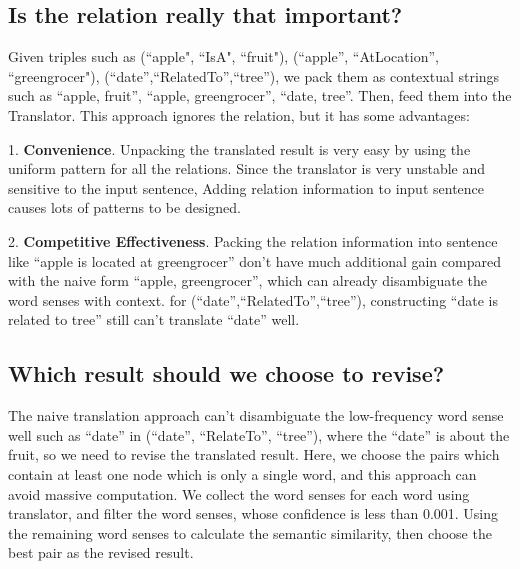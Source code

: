 \documentclass[letterpaper]{article} %
\begin{document}
\begin{CJK}{UTF8}{gkai}
\subsection{ Is the relation really that important?}
	Given triples such as (``apple", ``IsA", ``fruit"), (``apple'', ``AtLocation'', ``greengrocer"), (``date'',``RelatedTo'',``tree''), we pack them as contextual strings such as ``apple, fruit'', ``apple, greengrocer'', ``date, tree''. Then, feed them into the Translator.  This approach ignores the relation, but it has some advantages:
	
	1. \textbf{Convenience}. Unpacking the translated result is very easy by using the uniform pattern for all the relations. Since the translator is very unstable and sensitive to the input sentence, Adding relation information to input sentence causes lots of patterns to be designed.
	
	2. \textbf{Competitive Effectiveness}. Packing the relation information into sentence like ``apple is located at greengrocer'' don't have much additional gain compared with the naive form ``apple, greengrocer'', which can already disambiguate the word senses with context.  for  (``date'',``RelatedTo'',``tree''), constructing ``date is related to tree'' still can't translate ``date'' well.
	
\subsection{ Which result should we choose to revise?}
	The naive translation approach can't disambiguate the low-frequency word sense well such as ``date'' in (``date'', ``RelateTo'', ``tree''), where the ``date'' is about the fruit, so we need to revise the translated result. Here, we choose the pairs which contain at least one node which is only a single word, and this approach can avoid massive computation. We collect the word senses for each word using translator, and filter the word senses, whose confidence is less than 0.001. Using the remaining word senses to calculate the semantic similarity, then choose the best pair as the revised result.




\end{CJK}
\end{document}
